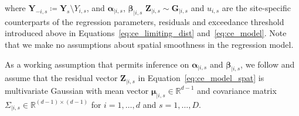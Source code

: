 \documentclass[12pt]{article}
\begin{document}
where $\symbf{Y}_{-i, s} \coloneqq \symbf{Y}_{s} \setminus Y_{i, s}$, and $\symbf{\alpha}_{\mid i, s}$, $\symbf{\beta}_{\mid i, s}$ $\symbf{Z}_{\mid i, s} \sim \symbf{G}_{\mid i, s}$ and $u_{i, s}$ are the site-specific counterparts of the regression parameters, residuals and exceedance threshold introduced above in Equations~\eqref{eq:ce_limiting_dist} and~\eqref{eq:ce_model}.
Note that we make no assumptions about spatial smoothness in the regression model. 

As a working assumption that permits inference on $\symbf{\alpha}_{\mid i, s}$ and $\symbf{\beta}_{\mid i, s}$, we follow \citet{Heffernan2004} and assume that the residual vector $\symbf{Z}_{\mid i, s}$ in Equation~\eqref{eq:ce_model_spat} is multivariate Gaussian with mean vector $\symbf{\mu}_{\mid i, s} \in\mathbb{R}^{d-1}$ and covariance matrix $\Sigma_{\mid i, s}\in\mathbb{R}^{(d-1)\times(d-1)}$ for $i = 1, \ldots, d$ and $s = 1, \ldots, D$.
\end{document}
